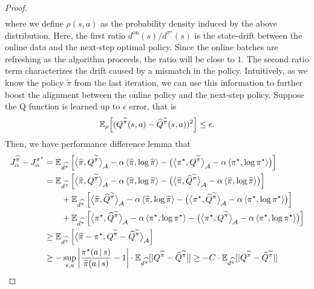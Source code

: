 \begin{proof}
\begin{align*}
\end{align*}
where we define $\rho(s, a)$ as the probability density induced by the above distribution.
Here, the first ratio $d^{\text{on}}(s)/d^{\pi^\star}(s)$ is the state-drift between the online data and the next-step optimal policy.
Since the online batches are refreshing as the algorithm proceeds, the ratio will be close to $1$. The second ratio term characterizes the drift caused by a mismatch in the policy. Intuitively, as we know the policy $\tilde\pi$ from the last iteration, we can use this information to further boost the alignment between the online policy and the next-step policy.
Suppose the Q function is learned up to $\epsilon$ error, that is 
\begin{align*}
    \mathbb{E}_{\rho}\!\left[(Q^{\widetilde\pi}(s, a) - \widehat{Q}^{\widetilde\pi}(s, a))^2\right] \leq \epsilon.
\end{align*}
Then, we have performance difference lemma that 
\begin{align*}
    J_{\alpha}^{\hat\pi} -J_{\alpha}^{\pi^\star}
       & = \EE_{d^{\hat\pi}} \left[ \bigl\langle\hat\pi, \QFunc^{\tilde\pi}\bigr\rangle_{\cA}-\alpha\tuple{\hat\pi,\log\hat\pi} - \bigl(\bigl\langle\pi^\star, \QFunc^{\tilde\pi}\bigr\rangle_{\cA} - \alpha\tuple{\pi^\star,\log\pi^\star}\bigr) \right]\\
       &= %
       \EE_{d^{\hat\pi}} \left[ \bigl\langle\hat\pi, \QFunc^{\tilde\pi}\bigr\rangle_{\cA}-\alpha\tuple{\hat\pi,\log\hat\pi} - \bigl(\bigl\langle\hat\pi, \hat\QFunc^{\tilde\pi}\bigr\rangle_{\cA}-\alpha\tuple{\hat\pi,\log\hat\pi}\bigr)\right]\\
       &\qquad + \EE_{d^{\hat\pi}} \left[ \bigl\langle\hat\pi, \hat\QFunc^{\tilde\pi}\bigr\rangle_{\cA}-\alpha\tuple{\hat\pi,\log\hat\pi} - \bigl(\bigl\langle\pi^\star, \hat\QFunc^{\tilde\pi}\bigr\rangle_{\cA}-\alpha\tuple{\pi^\star,\log\pi^\star}\bigr)\right]\\
       &\qquad + \EE_{d^{\hat\pi}} \left[ \bigl\langle\pi^\star, \hat\QFunc^{\tilde\pi}\bigr\rangle_{\cA}-\alpha\tuple{\pi^\star,\log\pi^\star} - \bigl(\bigl\langle\pi^\star, \QFunc^{\tilde\pi}\bigr\rangle_{\cA}-\alpha\tuple{\pi^\star,\log\pi^\star}\bigr)\right]\\
       &\ge %
       \EE_{d^{\hat\pi}} \left[ \bigl\langle\hat\pi - \pi^\star, \QFunc^{\tilde\pi} - \hat\QFunc^{\tilde\pi}\bigr\rangle_{\cA} \right] \\
       &\ge - \sup_{s, a}\left|\frac{\pi^\star(a\given s)}{\hat\pi(a\given s)} - 1\right| \cdot \EE_{d^{\hat\pi}}[|\QFunc^{\tilde\pi} - \hat\QFunc^{\tilde\pi}|] \ge - C \cdot \EE_{d^{\hat\pi}}[|\QFunc^{\tilde\pi} - \hat\QFunc^{\tilde\pi}|]

\end{align*}
\end{proof}
